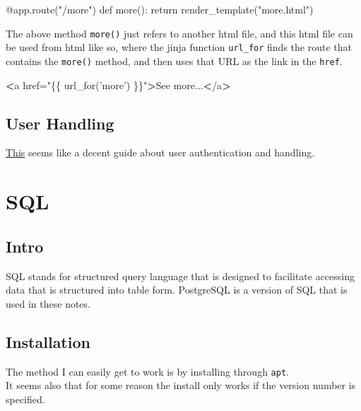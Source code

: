 \documentclass[]{book}
\newenvironment{Shaded}{\begin{snugshade}}{\end{snugshade}}
\newcommand{\StringTok}[1]{\textcolor[rgb]{0.31,0.60,0.02}{#1}}
\newcommand{\OperatorTok}[1]{\textcolor[rgb]{0.81,0.36,0.00}{\textbf{#1}}}
\newcommand{\BuiltInTok}[1]{#1}
\newcommand{\ExtensionTok}[1]{#1}
\newcommand{\NormalTok}[1]{#1}
\begin{document}
\begin{Shaded}
\begin{Highlighting}[]
\ExtensionTok{@app.route}\NormalTok{(}\StringTok{"/more"}\NormalTok{)}
\ExtensionTok{def}\NormalTok{ more()}\BuiltInTok{:}
    \BuiltInTok{return}\NormalTok{ render_template(}\StringTok{"more.html"}\NormalTok{)}
\end{Highlighting}
\end{Shaded}

The above method \texttt{more()} just refers to another html file, and
this html file can be used from html like so, where the jinja function
\texttt{url\_for} finds the route that contains the \texttt{more()}
method, and then uses that URL as the link in the \texttt{href}.

\begin{Shaded}
\begin{Highlighting}[]
\OperatorTok{<}\ExtensionTok{a}\NormalTok{ href=}\StringTok{"\{\{ url_for('more') \}\}"}\OperatorTok{>}\NormalTok{See more...}\OperatorTok{<}\NormalTok{/a}\OperatorTok{>}
\end{Highlighting}
\end{Shaded}

\section{User Handling}\label{user-handling}

\href{http://exploreflask.com/en/latest/users.html\#authentication}{This}
seems like a decent guide about user authentication and handling.

\chapter{SQL}\label{sql}

\section{Intro}\label{intro-2}

SQL stands for structured query language that is designed to facilitate
accessing data that is structured into table form. PostgreSQL is a
version of SQL that is used in these notes.

\section{Installation}\label{installation}

The method I can easily get to work is by installing through
\texttt{apt}.\\
It seems also that for some reason the install only works if the version
number is specified.
\end{document}
